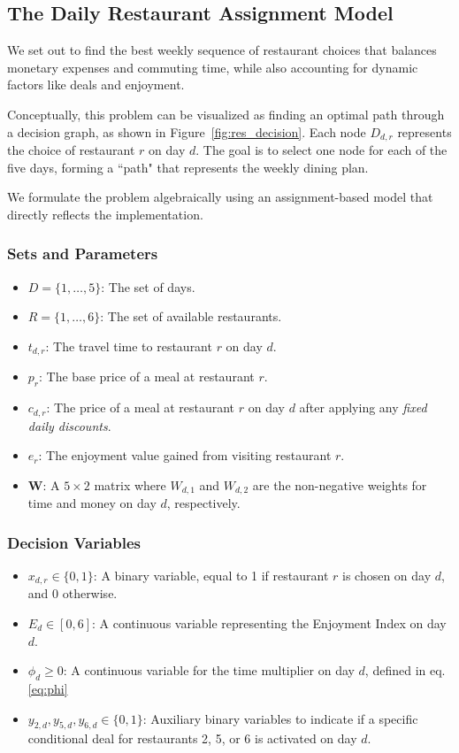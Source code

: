 \documentclass{article}
\newcommand{\bd}[1]{\mathbf{#1}}
\begin{document}
\subsection{The Daily Restaurant Assignment Model}
We set out to find the best weekly sequence of restaurant choices that balances monetary expenses and commuting time, while also accounting for dynamic factors like deals and enjoyment.

Conceptually, this problem can be visualized as finding an optimal path through a decision graph, as shown in Figure~\ref{fig:res_decision}. Each node $D_{d,r}$ represents the choice of restaurant $r$ on day $d$. The goal is to select one node for each of the five days, forming a ``path" that represents the weekly dining plan.


We formulate the problem algebraically using an assignment-based model that directly reflects the implementation.

\subsubsection*{Sets and Parameters}
\label{sec:para}
\begin{itemize}
    \item $D = \{1, \dots, 5\}$: The set of days.
    \item $R = \{1, \dots, 6\}$: The set of available restaurants.
    \item $t_{d,r}$: The travel time to restaurant $r$ on day $d$.
    \item $p_r$: The base price of a meal at restaurant $r$.
    \item $c_{d,r}$: The price of a meal at restaurant $r$ on day $d$ after applying any \textit{fixed daily discounts}.
    \item $e_r$: The enjoyment value gained from visiting restaurant $r$.
    \item $\bd{W}$: A $5 \times 2$ matrix where $W_{d,1}$ and $W_{d,2}$ are the non-negative weights for time and money on day $d$, respectively.
\end{itemize}

\subsubsection*{Decision Variables}
\begin{itemize}
    \item $x_{d,r} \in \{0, 1\}$: A binary variable, equal to 1 if restaurant $r$ is chosen on day $d$, and 0 otherwise.
    \item $E_d \in [0, 6]$: A continuous variable representing the Enjoyment Index on day $d$.
    \item $\phi_d \ge 0$: A continuous variable for the time multiplier on day $d$, defined in eq. \ref{eq:phi}
    \item $y_{2,d}, y_{5,d}, y_{6,d} \in \{0, 1\}$: Auxiliary binary variables to indicate if a specific conditional deal for restaurants 2, 5, or 6 is activated on day $d$.
\end{itemize}
\end{document}
